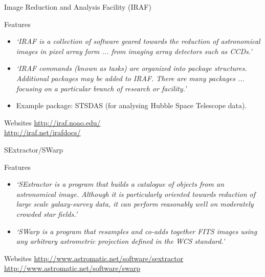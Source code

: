 \documentclass{beamer}
\begin{document}
\begin{frame}{Image Reduction and Analysis Facility (IRAF)}
  \begin{block}{Features}
   \begin{itemize}
   \item{\textit{`IRAF is a collection of software geared towards the reduction of astronomical images in pixel array form ... from imaging array detectors such as CCDs.'}}
   \item{\textit{`IRAF commands (known as tasks) are organized into package structures. Additional packages may be added to IRAF. There are many packages ... focusing on a particular branch of research or facility.'}}
   \item{ Example package: STSDAS (for analysing Hubble Space Telescope data).}
   \end{itemize}
  \end{block}
  \begin{block}{Websites}
    \url{http://iraf.noao.edu/}\\
    \url{http://iraf.net/irafdocs/}
  \end{block}
\end{frame}

\begin{frame}{SExtractor/SWarp}
  \begin{block}{Features}
   \begin{itemize}
    \item{\textit{`SExtractor is a program that builds a catalogue of objects from an astronomical image. Although it is particularly oriented towards reduction of large scale galaxy-survey data, it can perform reasonably well on moderately crowded star fields.'}}
    \item{\textit{`SWarp is a program that resamples and co-adds together FITS images using any arbitrary astrometric projection defined in the WCS standard.'}}
   \end{itemize}
  \end{block}
  \begin{block}{Websites}
    \url{http://www.astromatic.net/software/sextractor}\\
    \url{http://www.astromatic.net/software/swarp}
  \end{block}
\end{frame}
\end{document}
